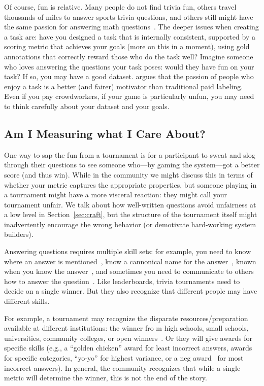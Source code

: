 Of course, fun is relative.
Many people do not find trivia fun, others travel thousands of miles to answer sports trivia questions,
and others still might have the same passion for answering math questions~\cite{amini-19}.
The deeper issues when creating a  task are:
have you designed a task that is internally consistent,
supported by a scoring metric that achieves your goals (more on this in a moment),
using gold annotations that correctly reward those who do the task well?
Imagine someone who loves answering the questions your task poses: would they have fun on your task?
If so, you may have a good dataset.
 argues that the passion of people who enjoy a task is a better (and fairer) motivator than traditional paid labeling.
Even if you pay crowdworkers, if your game is particularly unfun, you may need to think carefully about your dataset and your goals.

\subsection{Am I Measuring what I Care About?}

One way to sap the fun from a tournament is for a participant to sweat and slog through their questions to see someone who---by gaming the system---got a better score (and thus win).
While in the  community we might discuss this in terms of whether your metric captures the appropriate properties, but someone playing in a tournament might have a more visceral reaction: they might call your tournament unfair.
We talk about how well-written questions avoid unfairness at a low level in Section~\ref{sec:craft}, but the structure of the tournament itself might inadvertently encourage the wrong behavior (or demotivate hard-working system builders).

Answering questions requires multiple skill sets: for example, you need to know where an answer is mentioned~\cite{hermann-15}, know a cannonical name for the answer~\cite{yih-15}, known when you know the answer~\cite{rajpurkar-18}, and sometimes you need to communicate to others how to answer the question~\cite{fever-18}.
Like  leaderboards, trivia tournaments need to decide on a single winner.
But they also recognize that different people may have different skills.

For example, a tournament may recognize the disparate resources/preparation available at different institutions: the winner fro m high schools, small schools, universities, community colleges, or open winners~\cite{naqt-eligibility}.
Or they will give awards for specific skills (e.g., a ``golden chicken'' award for least incorrect answers, awards for specific categories, ``yo-yo'' for highest variance, or a neg award~\cite{neg-award} for most incorrect answers).
In general, the community recognizes that while a single metric will determine the winner, this is not the end of the story.

